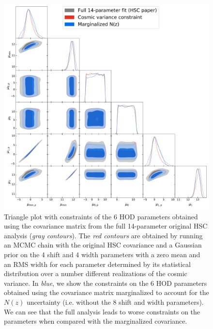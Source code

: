 \documentclass[a4paper,11pt]{article}
\begin{document}
\begin{figure}[ht]
\centering  
\includegraphics[width=1.\textwidth]{./triangle_fid_marg}
\caption{Triangle plot with constraints of 
the 6 HOD parameters obtained using the 
covariance matrix from the full
14-parameter original HSC analysis 
(\textit{gray contours}). The \textit{red
contours} are obtained by running an MCMC
chain with the original HSC covariance and
a Gaussian prior on the 4 shift and 4
width parameters with a zero mean and an RMS
width for each parameter determined by its 
statistical distribution over a number different 
realizations of the cosmic variance. In 
\textit{blue}, we show the constraints on the 6 
HOD parameters obtained using the covariance
matrix marginalized to account for the
$N(z)$ uncertainty (i.e. without the
8 shift and width parameters). We can
see that the full analysis leads to 
worse constraints on the parameters
when compared with the marginalized
covariance.}
\label{fig:triangle_fid_marg}
\end{figure}
\end{document}
